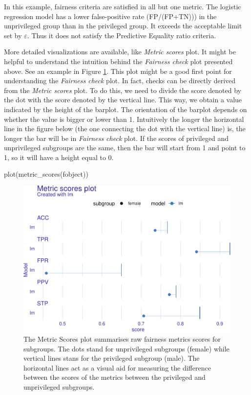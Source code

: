 In this example, fairness criteria are satisfied in all but one metric.
The logistic regression model has a lower false-positive rate
(FP/(FP+TN))) in the unprivileged group than in the privileged group. It
exceeds the acceptable limit set by \(\varepsilon\). Thus it does not
satisfy the Predictive Equality ratio criteria.

More detailed visualizations are available, like \emph{Metric scores}
plot. It might be helpful to understand the intuition behind the
\emph{Fairness check} plot presented above. See an example in Figure
\ref{fig:fairness-plot-2}. This plot might be a good first point for
understanding the \emph{Fairness check} plot. In fact, checks can be
directly derived from the \emph{Metric scores} plot. To do this, we need
to divide the score denoted by the dot with the score denoted by the
vertical line. This way, we obtain a value indicated by the height of
the barplot. The orientation of the barplot depends on whether the value
is bigger or lower than 1. Intuitively the longer the horizontal line in
the figure below (the one connecting the dot with the vertical line) is,
the longer the bar will be in \emph{Fairness check} plot. If the scores
of privileged and unprivileged subgroups are the same, then the bar will
start from 1 and point to 1, so it will have a height equal to 0.

\begin{Schunk}
\begin{Sinput}
plot(metric_scores(fobject))
\end{Sinput}
\begin{figure}

{\centering \includegraphics[width=0.75\linewidth]{Wisniewski-Biecek_files/figure-latex/fairness-plot-2-1} 

}

\caption[The Metric Scores plot summarises raw fairness metrics scores for subgroups]{The Metric Scores plot summarises raw fairness metrics scores for subgroups. The dots stand for unprivileged subgroups (female) while vertical lines stans for the privileged subgroup (male). The horizontal lines act as a visual aid for measuring the difference between the scores of the metrics between the privileged and unprivileged subgroups.}\label{fig:fairness-plot-2}
\end{figure}
\end{Schunk}

